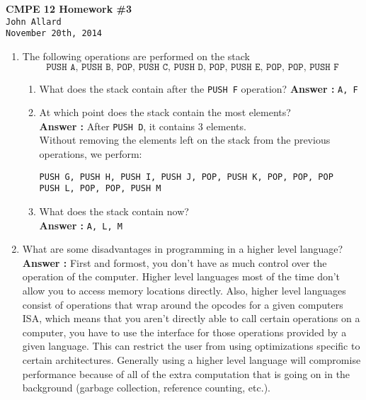 \documentclass[a4paper,11pt]{article}
\newcommand{\answer}{\textbf{Answer : }}
\begin{document}
   \begin{center}
      \Large\textbf{CMPE 12 Homework \#3}\\
      \large\texttt{John Allard} \\
      \small\texttt{November 20th, 2014}
   \end{center}


\begin{enumerate}

\item The following operations are performed on the stack 
$$ \texttt{PUSH A, PUSH B, POP, PUSH C, PUSH D, POP, PUSH E, POP, POP, PUSH F} $$
\begin{enumerate}
\item What does the stack contain after the \texttt{PUSH F} operation? \answer \texttt{A, F}
\item At which point does the stack contain the most elements? \\ \answer After \texttt{PUSH D}, it contains 3 elements.  \\[.15in] 
Without removing the elements left on the stack from the previous operations, we perform:
\begin{center} \texttt{PUSH G, PUSH H, PUSH I, PUSH J, POP, PUSH K, POP, POP, POP \\ PUSH L, POP, POP, PUSH M} \end{center}
\item What does the stack contain now? \\ \answer \texttt{A, L, M}
\end{enumerate}

\item What are some disadvantages in programming in a higher level language? \\
\answer First and formost, you don't have as much control over the operation of the computer. Higher level languages most of the time don't allow you to access memory locations directly. Also, higher level languages consist of operations that wrap around the opcodes for a given computers ISA, which means that you aren't directly able to call certain operations on a computer, you have to use the interface for those operations provided by a given language. This can restrict the user from using optimizations specific to certain architectures. Generally using a higher level language will compromise performance because of all of the extra computation that is going on in the background (garbage collection, reference counting, etc.).


\end{enumerate}
\end{document}
